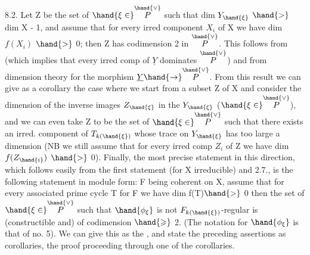 
8.2. Let Z be the set of $\hand{\xi\in}\overset{\hand{\vee}}{P}$ such that dim $Y_{\hand{\xi}}$ $\hand{>}$ dim X - 1,\hand{\unsure{\xi}}
and assume that for every irred component $X_i$ of X we have dim $f(X_i)$ $\hand{>}$ 0;
then Z has codimension 2 in $\overset{\hand{\vee}}{P}$.  This
follows from 
 (which implies that every irred comp of $\underline{Y}$ dominates $\overset{\hand{\vee}}{P}$) and from
dimension theory for the morphism $\underline{Y} \hand{\to} \overset{\hand{\vee}}{P}$. From this
result  we can give as a corollary the case where
we start from a   subset Z of X and consider the dimension of the
inverse images $Z_{\hand{\xi}}$ in the $Y_{\hand{\xi}}$ ($\hand{\xi\in}\overset{\hand{\vee}}{P}$), and we can even take
Z to be the set of $\hand{\xi\in}\overset{\hand{\vee}}{P}$ such that there exists an irred. component of $T_{k(\hand{\xi})}$
whose trace on $Y_{\hand{\xi}}$ has too large a dimension (NB we still assume
that for every irred comp $Z_i$ of Z we have dim $f(Z_{\hand{i}})$ $\hand{>}$ 0). Finally, the
most precise statement in this direction, which follows easily from the first
statement (for X irreducible) and 2.7., is the following statement in module form:
F being coherent on X,  assume that for every associated prime cycle
T for F we have dim f(T)$\hand{>}$ 0\unsure{;|,} then the set of $\hand{\xi\in}\overset{\hand{\vee}}{P}$ such that
$\hand{\phi_\xi}$ is not $F_{k(\hand{\xi})}$-regular is (constructible and) of codimension $\hand{\geqslant}$ 2.
 (The notation for $\hand{\phi_\xi}$ is that of no. 5). We can give this as the
 , and state the  preceding assertions
 as corollaries, the proof proceeding through one of the corollaries.

